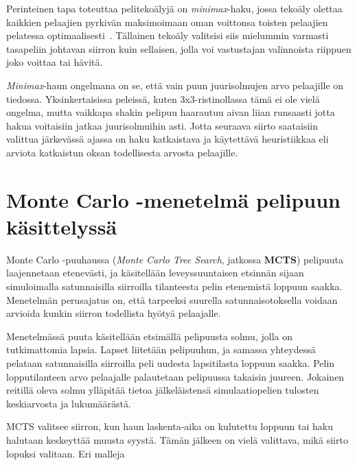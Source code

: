 \documentclass[12pt,finnish]{tktltiki2}
\theoremstyle{definition}
\theoremstyle{remark}
\begin{document}
Perinteinen tapa toteuttaa pelitekoälyjä on \textit{minimax}-haku, jossa tekoäly olettaa kaikkien pelaajien pyrkivän maksimoimaan oman voittonsa toisten pelaajien pelatessa optimaalisesti~\citep{aima}. Tällainen tekoäly valitsisi siis mielummin varmasti tasapeliin johtavan siirron kuin sellaisen, jolla voi vastustajan valinnoista riippuen joko voittaa tai hävitä.

\textit{Minimax}-haun ongelmana on se, että vain puun juurisolmujen arvo pelaajille on tiedossa. Yksinkertaisissa peleissä, kuten 3x3-ristinollassa tämä ei ole vielä ongelma, mutta vaikkapa shakin pelipuu haarautuu aivan liian runsaasti jotta hakua voitaisiin jatkaa juurisolmuihin asti. Jotta seuraava siirto saataisiin valittua järkevässä ajassa on haku katkaistava ja käytettävä heuristiikkaa eli arviota katkaistun oksan todellisesta arvosta pelaajille.~\citep{aima}


\section{Monte Carlo -menetelmä pelipuun käsittelyssä}

Monte Carlo -puuhaussa (\textit{Monte Carlo Tree Search}, jatkossa \textbf{MCTS}) pelipuuta laajennetaan etenevästi, ja käsitellään leveyssuuntaisen etsinnän sijaan simuloimalla satunnaisilla siirroilla tilanteesta pelin etenemistä loppuun saakka. Menetelmän perusajatus on, että tarpeeksi suurella satunnaisotoksella voidaan arvioida kunkin siirron todellista hyötyä pelaajalle.~\cite{browne}

Menetelmässä puuta käsitellään etsimällä pelipuusta solmu, jolla on tutkimattomia lapsia. Lapset liitetään pelipuuhun, ja samassa yhteydessä pelataan satunnaisilla siirroilla peli uudesta lapsitilasta loppuun saakka. Pelin lopputilanteen arvo pelaajalle palautetaan pelipuussa takaisin juureen. Jokainen reitillä oleva solmu ylläpitää tietoa jälkeläistensä simulaatiopelien tulosten keskiarvosta ja lukumäärästä.~\cite{browne}

MCTS valitsee siirron, kun haun laskenta-aika on kulutettu loppuun tai haku halutaan keskeyttää muusta syystä. Tämän jälkeen on vielä valittava, mikä siirto lopuksi valitaan. Eri malleja 

%
%
% 
%







% 
\end{document}
